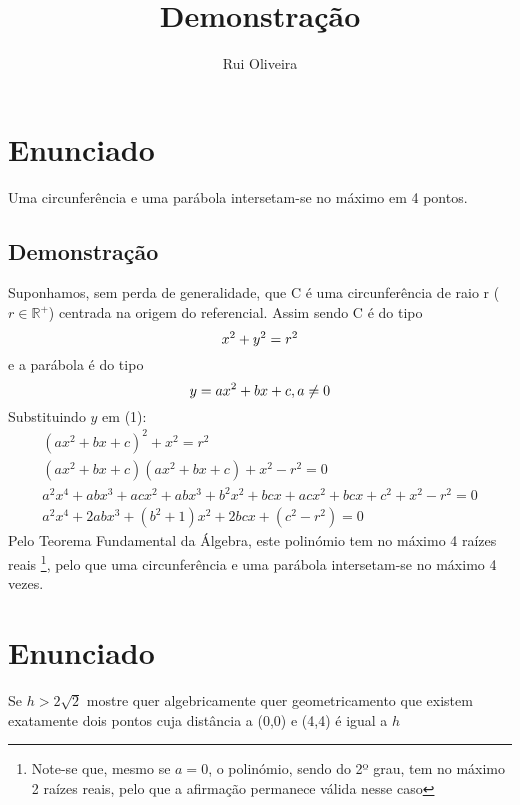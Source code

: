 \documentclass[10pt,a4paper]{article}
\author{Rui Oliveira}
\title{Demonstração}
\begin{document}
\section{Enunciado}

Uma circunferência e uma parábola intersetam-se no máximo em 4 pontos.

\subsection{Demonstração}
Suponhamos, sem perda de generalidade, que C é uma circunferência de raio r ($r \in \mathbb{R}^+$) centrada na origem do referencial.
Assim sendo C é do tipo 
\begin{equation}
x ^ 2 + y ^ 2 = r ^ 2\\ 
\end{equation}
e a parábola é do tipo 
\begin{equation}
y = ax^2 + bx + c,  a \neq 0 \\ 
\end{equation}
Substituindo $y$ em (1):
\begin{gather}
   (ax ^ 2+bx+c)^2 + x^2 = r^2\\
   (ax ^ 2+bx+c)(ax ^ 2+bx+c) + x^2 - r^2 = 0\\
   a^2x^4 + abx^3+acx^2+abx^3 + b^2x^2+bcx +acx^2 + bcx + c^2 + x^2 -r^2 = 0\\
   a^2x^4 + 2abx^3 + (b^2 + 1)x^2 + 2bcx + (c^2 - r^2) = 0
\end{gather}
Pelo Teorema Fundamental da Álgebra, este polinómio tem no máximo 4 raízes reais \footnote{Note-se que, mesmo se $a = 0$, o polinómio, sendo do 2º grau, tem no máximo 2 raízes reais, pelo que a afirmação permanece válida nesse caso}, pelo que uma circunferência e uma parábola intersetam-se no máximo 4 vezes.

\newpage

\section{Enunciado}

Se $h > 2\sqrt{2}$ mostre quer algebricamente quer geometricamento que existem exatamente dois pontos cuja distância a (0,0) e (4,4) é igual a $h$
\end{document}
